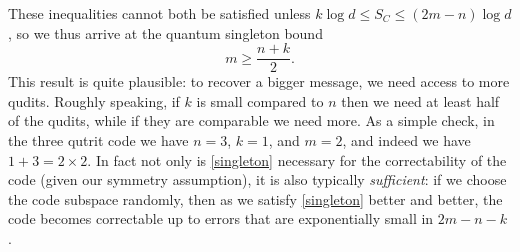 \documentclass[toc]{PoS}
\newcommand{\be}{\begin{equation}}
\newcommand{\ee}{\end{equation}}
\begin{document}
These inequalities cannot both be satisfied unless $k\log d\leq S_C\leq (2m-n)\log d$, so we thus arrive at the quantum singleton bound
\be\label{singleton}
m\geq \frac{n+k}{2}.
\ee
This result is quite plausible: to recover a bigger message, we need access to more qudits.  Roughly speaking, if $k$ is small compared to $n$ then we need at least half of the qudits, while if they are comparable we need more. As a simple check, in the three qutrit code we have $n=3$, $k=1$, and $m=2$, and indeed we have $1+3=2\times 2$.  In fact not only is \eqref{singleton} necessary for the correctability of the code (given our symmetry assumption), it is also typically \textit{sufficient}: if we choose the code subspace randomly, then as we satisfy \eqref{singleton} better and better, the code becomes correctable up to errors that are exponentially small in $2m-n-k$ \cite{Almheiri:2014lwa}.    
\end{document}
